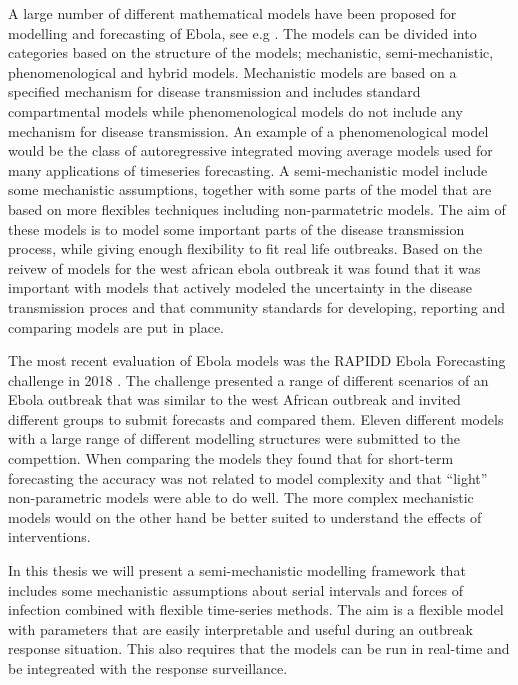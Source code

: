 \documentclass[12pt]{article}
\begin{document}
A large number of different mathematical models have been proposed for modelling and forecasting of Ebola, see e.g \cite{chretienMathematicalModelingWest,viboudRAPIDDEbolaForecasting2018}. The models can be divided into categories based on the structure of the models; mechanistic, semi-mechanistic, phenomenological and hybrid models. Mechanistic models are based on a specified mechanism for disease transmission and includes standard compartmental models while phenomenological models do not include any mechanism for disease transmission. An example of a phenomenological model would be the class of autoregressive integrated moving average models used for many applications of timeseries forecasting. A semi-mechanistic model include some mechanistic assumptions, together with some parts of the model that are based on more flexibles techniques including non-parmatetric models. The aim of these models is to model some important parts of the disease transmission process, while giving enough flexibility to fit real life outbreaks. Based on the reivew of models for the west african ebola outbreak it was found that it was important with models that actively modeled the uncertainty in the disease transmission proces \cite{chretienMathematicalModelingWest, kingAvoidableErrorsModelling2015} and that community standards for developing, reporting and comparing models are put in place. 


The most recent evaluation of Ebola models was the RAPIDD Ebola Forecasting challenge in 2018 \cite{viboudRAPIDDEbolaForecasting2018}. The challenge presented a range of different scenarios of an Ebola outbreak that was similar to the west African outbreak and invited different groups to submit forecasts and compared them. Eleven different models with a large range of different modelling structures were submitted to the compettion. When comparing the models they found that for short-term forecasting the accuracy was not related to model complexity and that ``light'' non-parametric models were able to do well. The more complex mechanistic models would on the other hand be better suited to understand the effects of interventions. 

In this thesis we will present a semi-mechanistic modelling framework that includes some mechanistic assumptions about serial intervals and forces of infection combined with flexible time-series methods. The aim is a flexible model with parameters that are easily interpretable and useful during an outbreak response situation. This also requires that the models can be run in real-time and be integreated with the response surveillance. 
\end{document}
